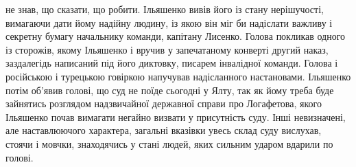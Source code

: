 \documentclass[a4paper,20pt]{report}
\begin{document}
не знав, що сказати, що робити. Ільяшенко вивів його із стану нерішучості,
вимагаючи дати йому надійну людину, із якою він міг би надіслати важливу і
секретну бумагу начальнику команди, капітану Лисенко.
Голова покликав одного із сторожів, якому Ільяшенко і вручив у запечатаному
конверті другий наказ, заздалегідь написаний під його диктовку, писарем
інвалідної команди. Голова і російською і турецькою говіркою напучував
надісланного настановами. Ільяшенко потім об'явив голові, що суд не поїде
сьогодні у Ялту, так як йому треба буде зайнятись розглядом надзвичайної
державної справи про Логафетова, якого Ільяшенко почав вимагати негайно визвати
у присутність суду. Інші невизначені, але наставлюючого характера, загальні
вказівки увесь склад суду вислухав, стоячи і мовчки, знаходячись у стані людей,
яких сильним ударом вдарили по голові.
\end{document}
